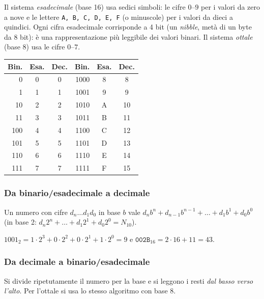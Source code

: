 \documentclass[11pt,a4paper]{article}
\begin{document}
\begin{definizione}
Il sistema \emph{esadecimale} (base 16) usa sedici simboli: le cifre $0$--$9$ per
i valori da zero a nove e le lettere \texttt{A, B, C, D, E, F} (o minuscole) per
i valori da dieci a quindici. Ogni cifra esadecimale corrisponde a 4 bit (un
\emph{nibble}, metà di un byte da 8 bit): è una rappresentazione più
leggibile dei valori binari. Il sistema \emph{ottale} (base 8) usa le cifre
$0$--$7$.
\end{definizione}

\begin{center}
\begin{tabular}{rcc @{\qquad} rcc}
\toprule
\textbf{Bin.} & \textbf{Esa.} & \textbf{Dec.} &
\textbf{Bin.} & \textbf{Esa.} & \textbf{Dec.} \\
\midrule
0    & 0 & 0  & 1000 & 8 & 8 \\
1    & 1 & 1  & 1001 & 9 & 9 \\
10   & 2 & 2  & 1010 & A & 10 \\
11   & 3 & 3  & 1011 & B & 11 \\
100  & 4 & 4  & 1100 & C & 12 \\
101  & 5 & 5  & 1101 & D & 13 \\
110  & 6 & 6  & 1110 & E & 14 \\
111  & 7 & 7  & 1111 & F & 15 \\
\bottomrule
\end{tabular}
\end{center}

\subsubsection{Da binario/esadecimale a decimale}

Un numero con cifre $d_n \dots d_1 d_0$ in base $b$ vale
$d_n b^n + d_{n-1} b^{n-1} + \dots + d_1 b^1 + d_0 b^0$ (in base 2:
$d_n 2^n + \dots + d_1 2^1 + d_0 2^0 = N_{10}$).

\begin{esempio}
$1001_2 = 1 \cdot 2^3 + 0 \cdot 2^2 + 0 \cdot 2^1 + 1 \cdot 2^0 = 9$ \quad e \quad
$\texttt{002B}_{16} = 2 \cdot 16 + 11 = 43$.
\end{esempio}

\subsubsection{Da decimale a binario/esadecimale}

Si divide ripetutamente il numero per la base e si leggono i resti
\emph{dal basso verso l'alto}. Per l'ottale si usa lo stesso algoritmo con base 8.
\end{document}
